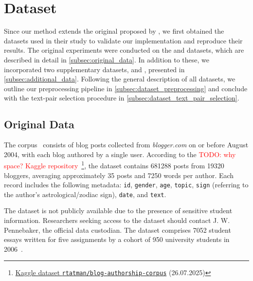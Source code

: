 \section{Dataset}
\label{sec:dataset}

Since our method extends the original \impAppr{} proposed by \citet{koppel_determining_2014}, we first obtained the datasets used in their study to validate our implementation and reproduce their results. 
The original experiments were conducted on the \dataBlog{} and \dataStudent{} datasets, which are described in detail in \autoref{subsec:original_data}. 
In addition to these, we incorporated two supplementary datasets, \dataPan{} and \dataGutenberg{}, presented in \autoref{subsec:additional_data}. 
Following the general description of all datasets, we outline our preprocessing pipeline in \autoref{subsec:dataset_preprocessing} and conclude with the text-pair selection procedure in \autoref{subsec:dataset_text_pair_selection}.


\subsection{Original Data}
\label{subsec:original_data}

The \dataBlog{} corpus~\citep{blog_dataset_2006} consists of blog posts collected from \textit{blogger.com} on or before August 2004, with each blog authored by a single user.
According to the \textcolor{red}{TODO: why space? Kaggle repository}~\footnote{\href{https://www.kaggle.com/datasets/rtatman/blog-authorship-corpus?resource=download}{Kaggle dataset \texttt{rtatman/blog-authorship-corpus}} (26.07.2025)}, the dataset contains \num{681288} posts from \num{19320} bloggers, averaging approximately 35 posts and \num{7250} words per author.
Each record includes the following metadata: \texttt{id}, \texttt{gender}, \texttt{age}, \texttt{topic}, 
\texttt{sign} (referring to the author's astrological/zodiac sign), \texttt{date}, and \texttt{text}.

The \dataStudent{} dataset is not publicly available due to the presence of sensitive student information. 
Researchers seeking access to the \dataStudent{} dataset should contact J. W. Pennebaker, the official data custodian. 
The dataset comprises \num{7052} student essays written for five assignments by a cohort of 950 university students in 2006~\citep{koppel_determining_2014}.

